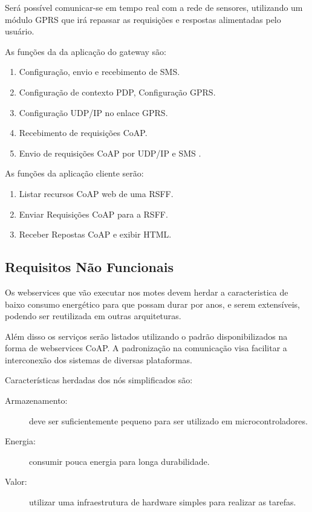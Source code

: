 Ser\'a poss\'ivel comunicar-se em tempo real com a rede de sensores, utilizando um m\'odulo GPRS que ir\'a repassar as requisi\c{c}\~oes e respostas alimentadas pelo usu\'ario.

As fun\c{c}\~oes da da aplica\c{c}\~ao do gateway s\~ao:
\begin{enumerate}
    \item Configura\c{c}\~ao, envio e recebimento de SMS.
    \item Configura\c{c}\~ao de contexto PDP, Configura\c{c}\~ao GPRS.
    \item Configura\c{c}\~ao UDP/IP no enlace GPRS.
    \item Recebimento de requisi\c{c}\~oes CoAP.
    \item Envio de requisi\c{c}\~oes CoAP por UDP/IP e SMS \cite{poetsch2013transport}.
\end{enumerate}

As fun\c{c}\~oes da aplica\c{c}\~ao cliente ser\~ao:

\begin{enumerate}
    \item Listar recursos CoAP web de uma RSFF.
    \item Enviar Requisi\c{c}\~oes CoAP para a RSFF.
    \item Receber Repostas CoAP e exibir HTML.
\end{enumerate}

\subsection{Requisitos N\~ao Funcionais}

Os webservices que v\~ao executar nos motes devem herdar a caracteristica de baixo consumo energ\'etico para que possam durar por anos, e serem extens\'iveis, podendo ser reutilizada em outras arquiteturas.

Al\'em disso os servi\c{c}os ser\~ao listados utilizando o padr\~ao \cite{rfc6690} disponibilizados na forma de webservices CoAP. A padroniza\c{c}\~ao na comunica\c{c}\~ao visa facilitar a interconex\~ao dos sistemas de diversas plataformas.

Caracter\'isticas herdadas dos n\'os simplificados s\~ao:
\begin{description}
\item[Armazenamento:] deve ser suficientemente pequeno para ser utilizado em microcontroladores.
\item[Energia:] consumir pouca energia para longa durabilidade.
\item[Valor:] utilizar uma infraestrutura de hardware simples para realizar as tarefas.
\end{description}

